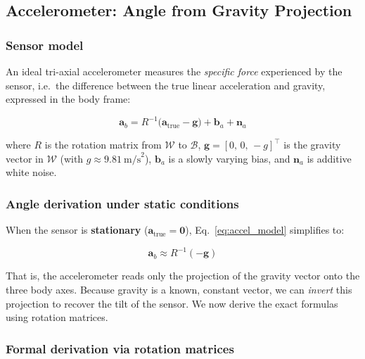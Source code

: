 \subsection{Accelerometer: Angle from Gravity Projection}
\label{sec:frames:accel}

\subsubsection{Sensor model}

An ideal tri-axial accelerometer measures the \emph{specific force}
experienced by the sensor, i.e.\ the difference between the true linear
acceleration and gravity, expressed in the body frame:

\begin{equation}
  \mathbf{a}_b = R^{-1}\!\bigl(\mathbf{a}_\text{true} - \mathbf{g}\bigr)
               + \mathbf{b}_a + \mathbf{n}_a
  \label{eq:accel_model}
\end{equation}

\noindent where $R$ is the rotation matrix from $\mathcal{W}$ to $\mathcal{B}$,
$\mathbf{g} = [0,\, 0,\, -g]^\top$ is the gravity vector in $\mathcal{W}$
(with $g \approx 9.81~\text{m/s}^2$),
$\mathbf{b}_a$ is a slowly varying bias, and $\mathbf{n}_a$ is additive white
noise.

\subsubsection{Angle derivation under static conditions}

When the sensor is \textbf{stationary}
($\mathbf{a}_\text{true} = \mathbf{0}$), Eq.~\eqref{eq:accel_model}
simplifies to:

\begin{equation}
  \mathbf{a}_b \approx R^{-1}(-\mathbf{g})
  \label{eq:accel_static}
\end{equation}

\noindent That is, the accelerometer reads only the projection of the gravity
vector onto the three body axes. Because gravity is a known, constant vector,
we can \emph{invert} this projection to recover the tilt of the sensor. We now
derive the exact formulas using rotation matrices.

\subsubsection{Formal derivation via rotation matrices}
\label{sec:frames:accel:derivation}

